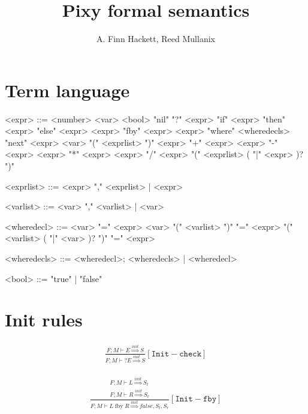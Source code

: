 \documentclass{scrartcl}
\DeclareMathOperator{\fby}{fby}
\begin{document}
    \title{Pixy formal semantics}
    \author{A. Finn Hackett, Reed Mullanix}
    \maketitle
    
    \section{Term language}
    
    \begin{grammar}
        <expr> ::= <number>
            \alt <var>
            \alt <bool>
            \alt "nil"
            \alt "?" <expr>
            \alt "if" <expr> "then" <expr> "else" <expr>
            \alt <expr> "fby" <expr>
            \alt <expr> "where" <wheredecls>
            \alt "next" <expr>
            \alt <var> "(" <exprlist> ")"
            \alt <expr> "+" <expr>
            \alt <expr> "-" <expr>
            \alt <expr> "*" <expr>
            \alt <expr> "/" <expr>
            \alt "(" <exprlist> ( "|" <expr> )? ")"
        
        <exprlist> ::= <expr> "," <exprlist> | <expr>
        
        <varlist> ::= <var> "," <varlist> | <var>
        
        <wheredecl> ::= <var> "=" <expr> 
            \alt <var> "(" <varlist> ")" "=" <expr>
            \alt "(" <varlist> ( "|" <var> )? ")" "=" <expr>
            
        <wheredecls> ::= <wheredecl>; <wheredecls> | <wheredecl>
        
        <bool> ::= "true" | "false"
    \end{grammar}

    \section{Init rules}
    
    \begin{align*}
    \frac{
        F; M \vdash E \overset{init}{\Rightarrow} S
    }{
        F; M \vdash ?E \overset{init}{\Rightarrow} S
    }[\mathtt{Init-check}]
    \end{align*}
    
    \begin{align*}
    \frac{
        \begin{matrix}
        F; M \vdash L \overset{init}{\Rightarrow} S_l \\
        F; M \vdash R \overset{init}{\Rightarrow} S_r
        \end{matrix}
    }{
        F; M \vdash L \fby R \overset{init}{\Rightarrow} false, S_l, S_r
    }[\mathtt{Init-fby}]
    \end{align*}
    
\end{document}
